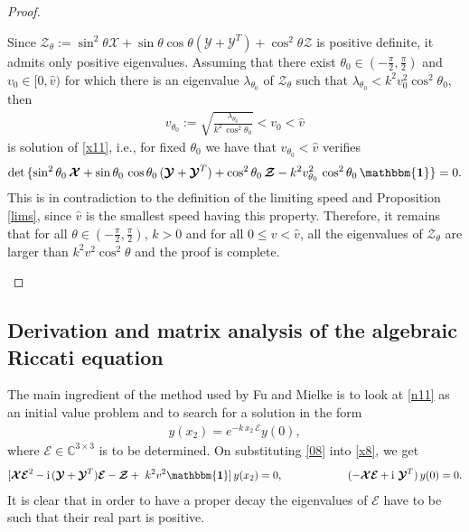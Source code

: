 \documentclass[10pt]{article}
\newcommand{\id}{{\mathbf{\mathbbm{1}}}}
\begin{document}
\begin{proof}
\begin{enumerate}
Since $\boldsymbol{\mathcal{Z}}_\theta:=\sin^2\theta\boldsymbol{\mathcal{X}}+\sin\theta\cos\theta (\boldsymbol{\mathcal{Y}}+\boldsymbol{\mathcal{Y}}^T)+\cos^2\theta\boldsymbol{\mathcal{Z}}$ is positive definite, it admits only positive eigenvalues.   Assuming that there exist  $\theta_0\in \left(-\frac{\pi}{2},\frac{\pi}{2}\right)$ and  $v_0\in[0,\widehat{v})$ for which there is an eigenvalue $\lambda_{\theta_0}$   of $\boldsymbol{\mathcal{Z}}_\theta$
such that $\lambda_{\theta_0}<k^2 v^2_0 \cos^2\theta_0 $, then 
\begin{align}
v_{\theta_0}:=\sqrt{\frac{\lambda_{\theta_0}}{k^2\,\cos^2\theta_0}}<v_0<\widehat{v}
\end{align}
is solution of \eqref{x11}, i.e., for fixed $\theta_0$ we have that $v_{\theta_0}<\widehat{v}$  verifies
 \begin{align}\label{x11n}
\det\,\{	\sin^2{\theta_0}\,\boldsymbol{\mathcal{X}}+\sin{\theta_0}\,\cos{\theta_0} \,(\boldsymbol{\mathcal{Y}}+\boldsymbol{\mathcal{Y}}^T)+\cos^2{\theta_0}\,\boldsymbol{\mathcal{Z}}-k^2 v^2_{{\theta_0}}\, \cos^2{\theta_0} \,{\id}\}=0.
\end{align} 
This is in contradiction to the definition of the limiting speed and Proposition \ref{lims}, since $\widehat{v}$ is the smallest speed having this property. Therefore, it remains that for all  $\theta\in \left(-\frac{\pi}{2},\frac{\pi}{2}\right)$, $k>0$ and for all $0\le v<\widehat{v}$, all the eigenvalues of $\boldsymbol{\mathcal{Z}}_\theta$ are larger than $k^2 v^2 \cos^2\theta$ and the proof is complete.\qedhere
	\end{enumerate}
\end{proof}


 \subsection{Derivation and matrix analysis of the algebraic Riccati equation}
 The main ingredient of the method used by Fu and Mielke \cite{fu2002new} is to  look at \eqref{n11} as  an initial value problem and to search for a solution in the form 
 \begin{align}\label{08}
 y(x_2)=e^{-k\,x_2 \,\boldsymbol{\mathcal{E}}}y(0),
 \end{align}
 where $\boldsymbol{\mathcal{E}}\in\mathbb{C}^{3 \times 3}$  is to be determined. On substituting \eqref{08} into  \eqref{x8}, we get
 \begin{align}\label{09}
 [\boldsymbol{\mathcal{X}}\boldsymbol{\mathcal{E}}^2- {\rm i}\, (\boldsymbol{\mathcal{Y}}+\boldsymbol{\mathcal{Y}}^T)\boldsymbol{\mathcal{E}}-\boldsymbol{\mathcal{Z}}+\ k^2v^2 {\id}]\, y(x_2)=0, \qquad\qquad \qquad  (-\boldsymbol{\mathcal{X}}\boldsymbol{\mathcal{E}}+ {\rm i}\, \,\boldsymbol{\mathcal{Y}}^T)\,y(0)=0.
 \end{align}
 It is clear that in order to have a proper decay the eigenvalues of $\boldsymbol{\mathcal{E}}$ have to be such that their real part is positive. 
 
\end{document}
